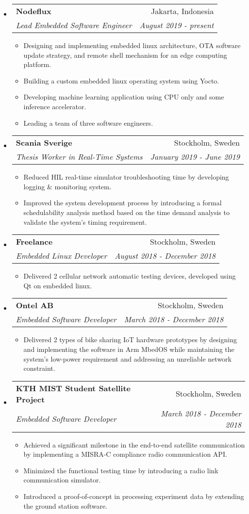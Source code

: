 \documentclass[letterpaper,9pt]{article}
\makeatletter
\newcommand{\resitem}[1]{\item #1 \vspace{-2pt}}
\newcommand{\ressubheading}[4]{
\begin{tabular*}{7.0in}{l@{\cftdotfill{\cftsecdotsep}\extracolsep{\fill}}r}
		\textbf{#1} & #2 \\
        \textit{#3} & \textit{#4} \\
\end{tabular*}\vspace{-6.3pt}}
\makeatother
\begin{document}
\begin{itemize}

  \item
        \ressubheading{Nodeflux}{Jakarta, Indonesia}{Lead Embedded Software Engineer}{August 2019 - present}
        \begin{itemize}
          \resitem{Designing and implementing embedded linux architecture, OTA software update strategy, and remote shell mechanism for an edge computing platform.}
          \resitem{Building a custom embedded linux operating system using Yocto.}
          \resitem{Developing machine learning application using CPU only and some inference accelerator.}
          \resitem{Leading a team of three software engineers.}
        \end{itemize}

  \item
        \ressubheading{Scania Sverige}{Stockholm, Sweden}{Thesis Worker in Real-Time Systems}{January 2019 - June 2019}
        \begin{itemize}
          \resitem{Reduced HIL real-time simulator troubleshooting time by developing logging \& monitoring system.}
          \resitem{Improved the system development process by introducing a formal schedulability analysis method based on the time demand analysis to validate the system's timing requirement.}
        \end{itemize}

  \item
        \ressubheading{Freelance}{Stockholm, Sweden}{Embedded Linux Developer}{August 2018 - December 2018}
        \begin{itemize}
          \resitem{Delivered 2 cellular network automatic testing devices, developed using Qt on embedded linux.}
        \end{itemize}

  \item
        \ressubheading{Ontel AB}{Stockholm, Sweden}{Embedded Software Developer}{March 2018 - December 2018}
        \begin{itemize}
          \resitem{Delivered 2 types of bike sharing IoT hardware prototypes by designing and implementing the software in Arm MbedOS while maintaining the system's low-power requirement and addressing an unreliable network constraint.}
        \end{itemize}

  \item
        \ressubheading{KTH MIST Student Satellite Project}{Stockholm, Sweden}{Embedded Software Developer}{March 2018 - December 2018}
        \begin{itemize}
          \resitem{Achieved a significant milestone in the end-to-end satellite communication by implementing a MISRA-C compliance radio communication API.}
          \resitem{Minimized the functional testing time by introducing a radio link communication simulator.}
          \resitem{Introduced a proof-of-concept in processing experiment data by extending the ground station software.}
        \end{itemize}


\end{itemize}
\end{document}
